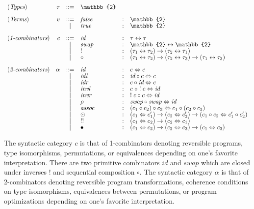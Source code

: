 \documentclass{entcs}
\newcommand{\swap}{\textit{swap}}
\newcommand{\id}{\textit{id}}
\newcommand{\compc}[2]{#1 \circ #2}
\newcommand{\alt}{~\mid~}
\newcommand{\invc}[1]{!\;#1}
\newcommand{\assocc}{\mathit{assoc}}
\newcommand{\invl}{\mathit{invl}}
\newcommand{\invr}{\mathit{invr}}
\newcommand{\idlc}{\mathit{idl}}
\newcommand{\idrc}{\mathit{idr}}
\newcommand{\iso}{\leftrightarrow}
\newcommand{\isotwo}{\Leftrightarrow}
\newcommand{\bt}{\mathbb{2}}
\newcommand{\fc}{\mathit{false}}
\newcommand{\tc}{\mathit{true}}
\begin{document}
\[\def\arraystretch{0.8}\begin{array}{l@{\quad}rclrl}
(\textit{Types}) & \tau &::=& \bt \\
\\
(\textit{Terms}) &  v &::=& \fc &:& \bt \\
              && \alt & \tc &:& \bt \\
\\
 (\textit{1-combinators}) &  c &::=& \id &:& \tau \iso \tau \\
               && \alt & \swap &:& \bt \iso \bt \\
               && \alt & ! &:& (\tau_1 \iso \tau_2) \to (\tau_2 \iso \tau_1) \\
               && \alt & \circ &:& (\tau_1 \iso \tau_2) \to (\tau_2 \iso \tau_3) \to (\tau_1 \iso \tau_3)  \\
\\
(\textit{2-combinators}) & \alpha &::=& \id &:& c \isotwo c \\
            && \alt & \idlc &:& \compc{\id}{c} \isotwo c \\
            && \alt & \idrc &:& \compc{c}{\id} \isotwo c \\
            && \alt & \invl &:& \compc{c\;}{\;\invc{c}} \isotwo \id \\
            && \alt & \invr &:& \compc{\invc{c}}{c} \isotwo \id \\
            && \alt & \rho &:& \swap \circ \swap \isotwo \id \\
            && \alt & \assocc &:& 
                                  \compc{(\compc{c_1}{c_2})}{c_3} \isotwo \compc{c_1}{(\compc{c_2}{c_3})} \\
            && \alt & \odot &:& (c_1 \isotwo c_1') \to (c_2 \isotwo c_2') \to 
                             (\compc{c_1}{c_2} \isotwo \compc{c_1'}{c_2'}) \\
            && \alt & !! &:& (c_1 \isotwo c_2) \to (c_2 \isotwo c_1) \\
            && \alt & \bullet &:& (c_1 \isotwo c_2) \to (c_2 \isotwo c_3) \to (c_1 \isotwo c_3)
\end{array}\]

The syntactic category $c$ is that of 1-combinators denoting
reversible programs, type isomorphisms, permutations, or equivalences
depending on one's favorite interpretation. There are two primitive
combinators $\id$ and $\swap$ which are closed under inverses $!$ and
sequential composition $\circ$. The syntactic category $\alpha$ is
that of 2-combinators denoting reversible program transformations,
coherence conditions on type isomorphisms, equivalences between
permutations, or program optimizations depending on one's favorite
interpretation.
\end{document}
